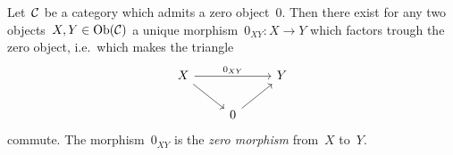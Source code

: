 \begin{remarkdefinition}
  Let~$\mathcal{C}$ be a category which admits a zero object~$0$.
  Then there exist for any two objects~$X, Y \in \operatorname{Ob}(\mathcal{C})$ a unique morphism~$0_{XY} \colon X \to Y$ which factors trough the zero object, i.e.\ which makes the triangle
  \[
    \begin{tikzcd}
        X
        \arrow{dr}
        \arrow{rr}[above]{0_{XY}}
      & {}
      & Y
      \\
        {}
      & 0
        \arrow{ur}
      & {}
    \end{tikzcd}
  \]
  commute.
  The morphism~$0_{XY}$ is the \emph{zero morphism} from~$X$ to~$Y$.
\end{remarkdefinition}










